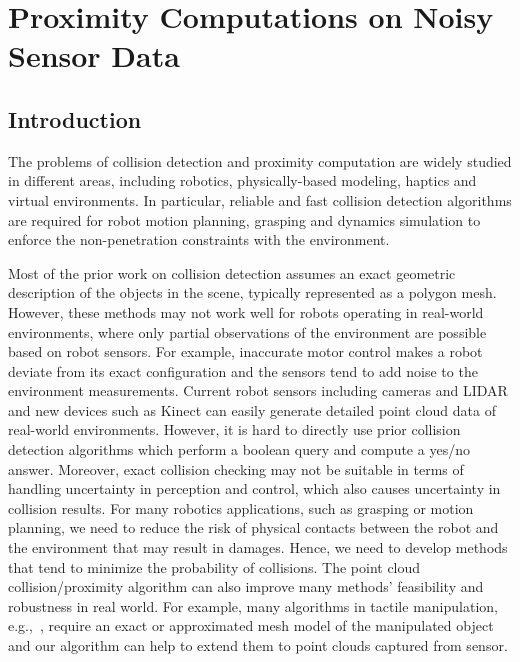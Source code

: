 \chapter{Proximity Computations on Noisy Sensor Data}
\label{chp:PCollide}

\section{Introduction}
The problems of collision detection and proximity computation are widely studied in different areas, including robotics, physically-based modeling, haptics and virtual environments. In particular, reliable and fast collision detection algorithms are required for robot motion planning, grasping and dynamics simulation to enforce the non-penetration constraints with the environment.

Most of the prior work on collision detection assumes an exact geometric description of the objects in the scene, typically represented as a polygon mesh. However, these methods may not work well
for robots operating in real-world environments, where only partial observations of the environment are possible based on robot sensors. For example, inaccurate motor control makes a robot deviate from its
exact configuration and the sensors tend to add noise to the environment measurements.
Current robot sensors including cameras and LIDAR and new devices such as Kinect can easily generate detailed point cloud data of real-world environments. However, it is hard to directly use prior collision detection algorithms which perform a boolean query and compute a yes/no answer.
Moreover, exact collision checking may not be suitable in terms of
handling uncertainty in perception and control, which also causes uncertainty in collision results.
For many robotics applications, such as grasping or motion planning, we need to reduce the risk
of physical contacts between the robot and the environment that may result in damages. Hence, we need to develop methods that tend to minimize the probability of collisions. The point cloud collision/proximity algorithm can also improve many methods' feasibility and robustness in real world. For example, many algorithms in tactile manipulation, e.g.,~\cite{anna:2011}, require an exact or approximated mesh model of the manipulated object and our algorithm can help to extend them to point clouds captured from sensor.

